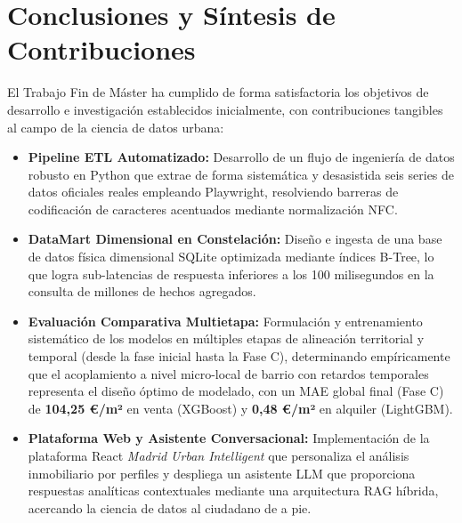 \documentclass[a4paper,11pt,openany]{book}
\begin{document}
\section{Conclusiones y Síntesis de Contribuciones}
El Trabajo Fin de Máster ha cumplido de forma satisfactoria los objetivos de desarrollo e investigación establecidos inicialmente, con contribuciones tangibles al campo de la ciencia de datos urbana:
\begin{itemize}
    \item \textbf{Pipeline ETL Automatizado:} Desarrollo de un flujo de ingeniería de datos robusto en Python que extrae de forma sistemática y desasistida seis series de datos oficiales reales empleando Playwright, resolviendo barreras de codificación de caracteres acentuados mediante normalización NFC.
    \item \textbf{DataMart Dimensional en Constelación:} Diseño e ingesta de una base de datos física dimensional SQLite optimizada mediante índices B-Tree, lo que logra sub-latencias de respuesta inferiores a los 100 milisegundos en la consulta de millones de hechos agregados.
    \item \textbf{Evaluación Comparativa Multietapa:} Formulación y entrenamiento sistemático de los modelos en múltiples etapas de alineación territorial y temporal (desde la fase inicial hasta la Fase C), determinando empíricamente que el acoplamiento a nivel micro-local de barrio con retardos temporales representa el diseño óptimo de modelado, con un MAE global final (Fase C) de \textbf{104,25 €/m²} en venta (XGBoost) y \textbf{0,48 €/m²} en alquiler (LightGBM).
    \item \textbf{Plataforma Web y Asistente Conversacional:} Implementación de la plataforma React \textit{Madrid Urban Intelligent} que personaliza el análisis inmobiliario por perfiles y despliega un asistente LLM que proporciona respuestas analíticas contextuales mediante una arquitectura RAG híbrida, acercando la ciencia de datos al ciudadano de a pie.
\end{itemize}
\end{document}
